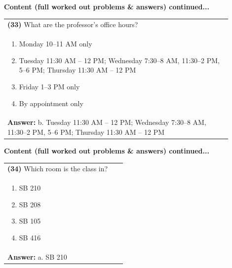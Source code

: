 \documentclass{article}
\begin{document}
{{{{{{{{{{{{%

\noindent
{\large\textbf{Content (full worked out problems \& answers) continued...}\\[0.2em]
\vspace{0.2cm}
\begin{tabular}{|p{0.9\linewidth}|}
\hline
\vspace{0.2cm}
\textbf{(33)} What are the professor's office hours?\\
\begin{minipage}[t]{0.85\linewidth}
\begin{enumerate}[label=\alph*.]
   \item Monday 10–11 AM only
   \item Tuesday 11:30 AM – 12 PM; Wednesday 7:30–8 AM, 11:30–2 PM, 5–6 PM; Thursday 11:30 AM – 12 PM
   \item Friday 1–3 PM only
   \item By appointment only
\end{enumerate}
\end{minipage}\\
\hline
\vspace{0.2cm}
\textbf{Answer:} b. Tuesday 11:30 AM – 12 PM; Wednesday 7:30–8 AM, 11:30–2 PM, 5–6 PM; Thursday 11:30 AM – 12 PM\\
\hline
\end{tabular}
\newpage

\noindent
{\large\textbf{Content (full worked out problems \& answers) continued...}\\[0.2em]
\vspace{0.2cm}
\begin{tabular}{|p{0.9\linewidth}|}
\hline
\vspace{0.2cm}
\textbf{(34)} Which room is the class in?\\
\begin{minipage}[t]{0.85\linewidth}
\begin{enumerate}[label=\alph*.]
   \item SB 210
   \item SB 208
   \item SB 105
   \item SB 416
\end{enumerate}
\end{minipage}\\
\hline
\vspace{0.2cm}
\textbf{Answer:} a. SB 210\\
\hline
\end{tabular}

}}}}}}}}}}}}}}
\end{document}
